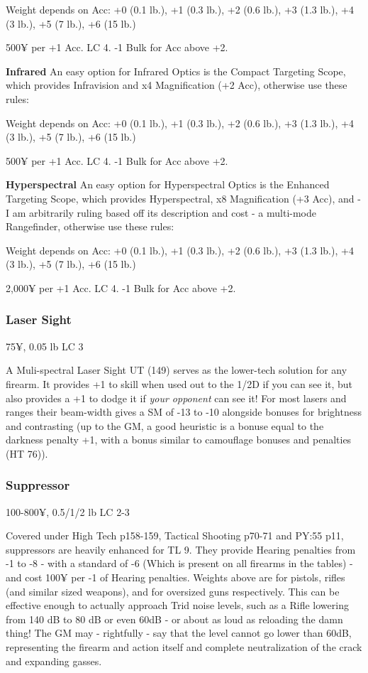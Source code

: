 Weight depends on Acc: +0 (0.1 lb.), +1 (0.3 lb.), +2 (0.6 lb.), +3 (1.3 lb.), +4 (3 lb.), +5 (7 lb.), +6 (15 lb.)

500¥ per +1 Acc. LC 4. -1 Bulk for Acc above +2.

\textbf{Infrared}
An easy option for Infrared Optics is the Compact Targeting Scope, which provides Infravision and x4 Magnification (+2 Acc), otherwise use these rules:

Weight depends on Acc: +0 (0.1 lb.), +1 (0.3 lb.), +2 (0.6 lb.), +3 (1.3 lb.), +4 (3 lb.), +5 (7 lb.), +6 (15 lb.)

500¥ per +1 Acc. LC 4. -1 Bulk for Acc above +2.

\textbf{Hyperspectral}
An easy option for Hyperspectral Optics is the Enhanced Targeting Scope, which provides Hyperspectral, x8 Magnification (+3 Acc), and - I am arbitrarily ruling based off its description and cost - a multi-mode Rangefinder, otherwise use these rules:

Weight depends on Acc: +0 (0.1 lb.), +1 (0.3 lb.), +2 (0.6 lb.), +3 (1.3 lb.), +4 (3 lb.), +5 (7 lb.), +6 (15 lb.)

2,000¥ per +1 Acc. LC 4. -1 Bulk for Acc above +2.

\subsubsection{Laser Sight}\label{laser_sight}
75¥, 0.05 lb LC 3

A Muli-spectral Laser Sight UT (149) serves as the lower-tech solution for any firearm. It provides +1 to skill when used out to the 1/2D if you can see it, but also provides a +1 to dodge it if \textit{your opponent} can see it! For most lasers and ranges their beam-width gives a SM of -13 to -10 alongside bonuses for brightness and contrasting (up to the GM, a good heuristic is a bonuse equal to the darkness penalty +1, with a bonus similar to camouflage bonuses and penalties (HT 76)).

\subsubsection{Suppressor}
100-800¥, 0.5/1/2 lb LC 2-3

Covered under High Tech p158-159, Tactical Shooting p70-71 and PY:55 p11, suppressors are heavily enhanced for TL 9. They provide Hearing penalties from -1 to -8 - with a standard of -6 (Which is present on all firearms in the tables) - and cost 100¥ per -1 of Hearing penalties. Weights above are for pistols, rifles (and similar sized weapons), and for oversized guns respectively. This can be effective enough to actually approach Trid noise levels, such as a Rifle lowering from 140 dB to 80 dB or even 60dB - or about as loud as reloading the damn thing! The GM may - rightfully - say that the level cannot go lower than 60dB, representing the firearm and action itself and complete neutralization of the crack and expanding gasses.

